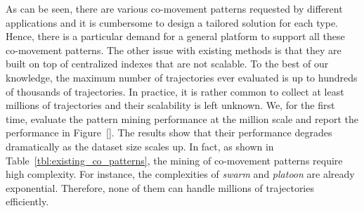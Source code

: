 



As can be seen, there are various co-movement patterns requested by different applications and it is cumbersome to design a tailored solution for each type. Hence, there is a particular demand for a general platform to support all these co-movement patterns. The other issue with existing methods is that they are built on top of centralized indexes that are not scalable. To the best of our knowledge, the maximum number of trajectories ever evaluated is up to hundreds of thousands of trajectories. In practice, it is rather common to collect at least millions of trajectories and their scalability is left unknown. We, for the first time, evaluate the pattern mining performance at the million scale and report the performance in Figure~\ref{}. The results show that their performance degrades dramatically as the dataset size scales up. In fact, as shown in Table~\ref{tbl:existing_co_patterns}, the mining of co-movement patterns require high complexity. For instance, the
complexities of \emph{swarm} and \emph{platoon} are already exponential. 
Therefore, none of them can handle millions of trajectories efficiently. 

